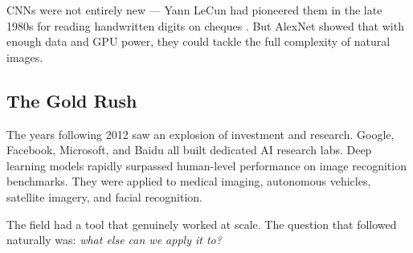 CNNs were not entirely new --- Yann LeCun had pioneered them in the late 1980s for reading handwritten digits on cheques \cite{lecun1989backpropagation}.
But AlexNet showed that with enough data and GPU power, they could tackle the full complexity of natural images.

\subsection{The Gold Rush}

The years following 2012 saw an explosion of investment and research.
Google, Facebook, Microsoft, and Baidu all built dedicated AI research labs.
Deep learning models rapidly surpassed human-level performance on image recognition benchmarks.
They were applied to medical imaging, autonomous vehicles, satellite imagery, and facial recognition.

The field had a tool that genuinely worked at scale.
The question that followed naturally was: \emph{what else can we apply it to?}
